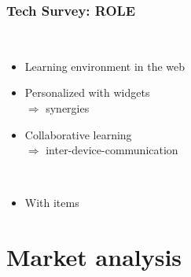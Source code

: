\begin{frame}
  \frametitle{Tech Survey: ROLE}
      \begin{description}[]
        \item[ROLE (Responsive Open Learning Environments)] \hfill \\
        \begin{itemize}
          \item Learning environment in the web
          \item Personalized with widgets\\ $\Rightarrow$ synergies
          \item Collaborative learning\\ $\Rightarrow$ inter-device-communication
        \end{itemize}
        \item[Some other Tech] \hfill \\
        \begin{itemize}
          \item With items
        \end{itemize}
      \end{description}
\end{frame}

\section{Market analysis}

